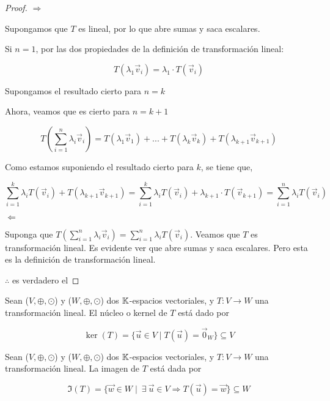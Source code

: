 \begin{proof}
$\Rightarrow$

Supongamos que $T$ es lineal, por lo que abre sumas y saca escalares. 

Si $n=1$, por las dos propiedades de la definición de transformación lineal:

$$T(\lambda_1 {\vec{v}}_{i} ) = \lambda_1 \cdot T({\vec{v}}_{i})$$

Supongamos el resultado cierto para $n=k$

Ahora, veamos que es cierto para $n = k + 1$

$$T \left( \sum_{i=1}^{n} \lambda_i {\vec{v}}_{i} \right) = T \left( \lambda_1 {\vec{v}}_{1} \right) + ... + T\left( \lambda_k {\vec{v}}_{k} \right) + T\left( \lambda_{k+1} {\vec{v}}_{k+1} \right) $$

Como estamos suponiendo el resultado cierto para $k$, se tiene que,

$$ \sum_{i=1}^{k}\lambda_i  T\left( {\vec{v}}_{i} \right)  + T\left( \lambda_{k+1} {\vec{v}}_{k+1} \right) = \sum_{i=1}^{k}\lambda_i  T\left( {\vec{v}}_{i} \right) + \lambda_{k+1}  \cdot T\left( {\vec{v}}_{k+1}  \right) = \sum_{i=1}^{n}\lambda_i  T\left( {\vec{v}}_{i} \right)$$

$\Leftarrow$

Suponga que $T \left( \sum\limits_{i=1}^{n} \lambda_i {\vec{v}}_{i} \right) =  \sum\limits_{i=1}^{n}\lambda_i  T\left( {\vec{v}}_{i} \right)$. Veamos que $T$ es transformación lineal. Es evidente ver que abre sumas y saca escalares. Pero esta es la definición de transformación lineal. 

$\therefore$ es verdadero el 
\end{proof}

\begin{definition}[Núcleo]
     Sean ($V, \oplus, \odot$) y ($W, \oplus, \odot$) dos $\mathbb{K}$-espacios vectoriales, y $T : V \to W$ una transformación lineal. El núcleo o kernel de $T$ está dado por 

     $$\ker(T) = \{ \vec{u} \in V \mid T(\vec{u}) = \vec{0}_W \} \subseteq V$$
\end{definition}

\begin{definition}[Imágen]
    Sean ($V, \oplus, \odot$) y ($W, \oplus, \odot$) dos $\mathbb{K}$-espacios vectoriales, y $T : V \to W$ una transformación lineal. La imagen de $T$ está dada por 

    $$\Im(T) = \{ \vec{w} \in W \mid \: \exists \: \vec{u} \in V \Rightarrow T(\vec{u}) = \vec{w} \} \subseteq W$$
\end{definition}

